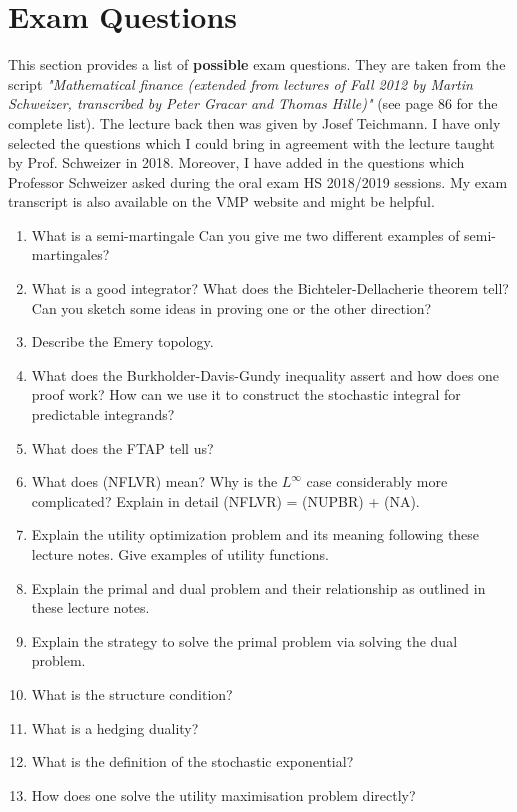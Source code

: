 \documentclass[12pt,a4paper, twoside]{article}
\theoremstyle{definition}
\begin{document}
\section{Exam Questions}
This section provides a list of \textbf{possible} exam questions. They are taken from the script \textit{"Mathematical finance (extended from lectures of Fall 2012 by Martin Schweizer, transcribed by Peter Gracar and Thomas Hille)"} (see page 86 for the complete list). The lecture back then was given by Josef Teichmann. I have only selected the questions which I could bring in agreement with the lecture taught by Prof. Schweizer in 2018. Moreover, I have added in the questions which Professor Schweizer asked during the oral exam HS 2018/2019 sessions. My exam transcript is also available on the VMP website and might be helpful.
\begin{enumerate}
\item What is a semi-martingale Can you give me two different examples of semi-martingales?
\item What is a good integrator? What does the Bichteler-Dellacherie theorem tell? Can you sketch some ideas in proving one or the other direction?
\item Describe the Emery topology.
\item What does the Burkholder-Davis-Gundy inequality assert and how does one proof work? How can we use it to construct the stochastic integral for predictable integrands?
\item What does the FTAP tell us?
\item What does (NFLVR) mean? Why is the $L^\infty$ case considerably more complicated? Explain in detail (NFLVR) = (NUPBR) + (NA).
\item Explain the utility optimization problem and its meaning following these lecture notes. Give examples of utility functions.
\item Explain the primal and dual problem and their relationship as outlined in these lecture notes. 
\item Explain the strategy to solve the primal problem via solving the dual problem. 
\item  What is the structure condition?
\item What is a hedging duality?
\item  What is the definition of the stochastic exponential?
\item  How does one solve the utility maximisation problem directly? 
\end{enumerate} 
\end{document}
